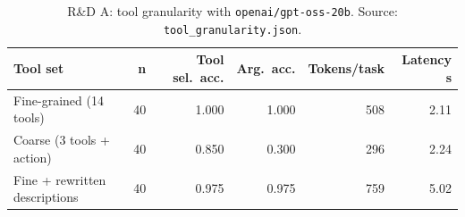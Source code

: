 \begin{table}[t]\centering\small\caption{R\&D A: tool granularity with \texttt{openai/gpt-oss-20b}. Source: \texttt{tool\_granularity.json}.}\label{tab:tools}
\begin{tabular}{lrrrrr}\toprule Tool set & n & Tool sel.\ acc. & Arg.\ acc. & Tokens/task & Latency s\\\midrule
Fine-grained (14 tools) & 40 & 1.000 & 1.000 & 508 & 2.11 \\
Coarse (3 tools + action) & 40 & 0.850 & 0.300 & 296 & 2.24 \\
Fine + rewritten descriptions & 40 & 0.975 & 0.975 & 759 & 5.02 \\
\bottomrule\end{tabular}\end{table}